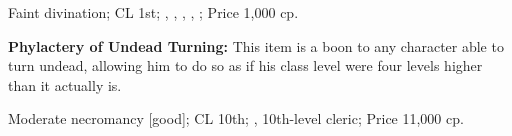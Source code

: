 Faint divination; CL 1st; , , , , ; Price 1,000 cp.


\textbf{Phylactery of Undead Turning:} This item is a boon to any character able to turn undead, allowing him to do so as if his class level were four levels higher than it actually is.

Moderate necromancy [good]; CL 10th; , 10th-level cleric; Price 11,000 cp.
